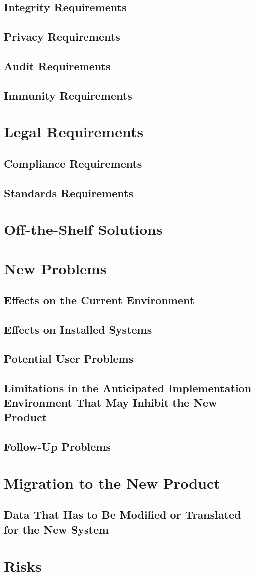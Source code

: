 \documentclass[12pt,a4paper]{article}
\begin{document}
\subsection{Integrity Requirements}
\subsection{Privacy Requirements}
\subsection{Audit Requirements}
\subsection{Immunity Requirements}
\pagebreak
\section{Legal Requirements}
\subsection{Compliance Requirements}
\subsection{Standards Requirements}
\pagebreak
\section{Off-the-Shelf Solutions}
\pagebreak
\section{New Problems}
\subsection{Effects on the Current Environment}
\subsection{Effects on Installed Systems}
\subsection{Potential User Problems}
\subsection{Limitations in the Anticipated Implementation Environment That May Inhibit the New Product}
\subsection{Follow-Up Problems}
\pagebreak
\section{Migration to the New Product}
\subsection{Data That Has to Be Modified or Translated for the New System}
\pagebreak
\section{Risks}
\end{document}
